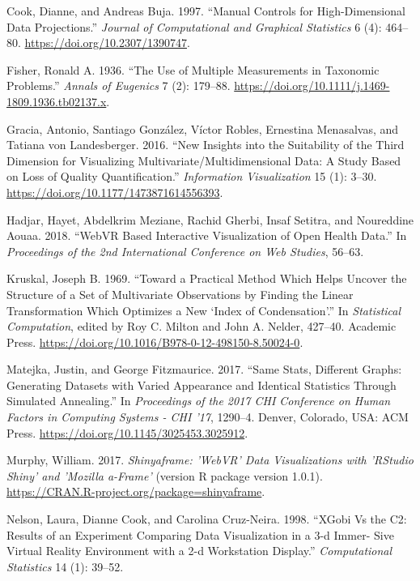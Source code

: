 \documentclass[11,]{article}
\begin{document}
\leavevmode\hypertarget{ref-cook_manual_1997}{}%
Cook, Dianne, and Andreas Buja. 1997. ``Manual Controls for High-Dimensional Data Projections.'' \emph{Journal of Computational and Graphical Statistics} 6 (4): 464--80. \url{https://doi.org/10.2307/1390747}.

\leavevmode\hypertarget{ref-fisher_use_1936}{}%
Fisher, Ronald A. 1936. ``The Use of Multiple Measurements in Taxonomic Problems.'' \emph{Annals of Eugenics} 7 (2): 179--88. \url{https://doi.org/10.1111/j.1469-1809.1936.tb02137.x}.

\leavevmode\hypertarget{ref-gracia_new_2016}{}%
Gracia, Antonio, Santiago González, Víctor Robles, Ernestina Menasalvas, and Tatiana von Landesberger. 2016. ``New Insights into the Suitability of the Third Dimension for Visualizing Multivariate/Multidimensional Data: A Study Based on Loss of Quality Quantification.'' \emph{Information Visualization} 15 (1): 3--30. \url{https://doi.org/10.1177/1473871614556393}.

\leavevmode\hypertarget{ref-hadjar_webvr_2018}{}%
Hadjar, Hayet, Abdelkrim Meziane, Rachid Gherbi, Insaf Setitra, and Noureddine Aouaa. 2018. ``WebVR Based Interactive Visualization of Open Health Data.'' In \emph{Proceedings of the 2nd International Conference on Web Studies}, 56--63.

\leavevmode\hypertarget{ref-kruskal_toward_1969}{}%
Kruskal, Joseph B. 1969. ``Toward a Practical Method Which Helps Uncover the Structure of a Set of Multivariate Observations by Finding the Linear Transformation Which Optimizes a New `Index of Condensation'.'' In \emph{Statistical Computation}, edited by Roy C. Milton and John A. Nelder, 427--40. Academic Press. \url{https://doi.org/10.1016/B978-0-12-498150-8.50024-0}.

\leavevmode\hypertarget{ref-matejka_same_2017}{}%
Matejka, Justin, and George Fitzmaurice. 2017. ``Same Stats, Different Graphs: Generating Datasets with Varied Appearance and Identical Statistics Through Simulated Annealing.'' In \emph{Proceedings of the 2017 CHI Conference on Human Factors in Computing Systems - CHI '17}, 1290--4. Denver, Colorado, USA: ACM Press. \url{https://doi.org/10.1145/3025453.3025912}.

\leavevmode\hypertarget{ref-murphy_shinyaframe_2017}{}%
Murphy, William. 2017. \emph{Shinyaframe: 'WebVR' Data Visualizations with 'RStudio Shiny' and 'Mozilla a-Frame'} (version R package version 1.0.1). \url{https://CRAN.R-project.org/package=shinyaframe}.

\leavevmode\hypertarget{ref-nelson_xgobi_1998}{}%
Nelson, Laura, Dianne Cook, and Carolina Cruz-Neira. 1998. ``XGobi Vs the C2: Results of an Experiment Comparing Data Visualization in a 3-d Immer- Sive Virtual Reality Environment with a 2-d Workstation Display.'' \emph{Computational Statistics} 14 (1): 39--52.
\end{document}

